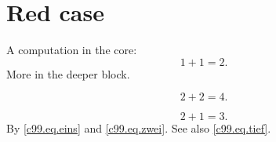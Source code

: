 \chapter{Red case}\label{c99}

A computation in the core:
\begin{equation}\label{c99.eq.eins}
  1 + 1 = 2.
\end{equation}
More in the deeper block.

\begin{vertiefung}[id=c99.v1, titel={Deeper}, wozu={Shows a second computation.},
    voraussetzung={Equation~\eqref{c99.eq.eins}.}, zurueck={It stays at two.}]
  \begin{equation}\label{c99.eq.tief}
    2 + 2 = 4.
  \end{equation}
\end{vertiefung}

\begin{equation}\label{c99.eq.zwei}
  2 + 1 = 3.
\end{equation}
By \eqref{c99.eq.eins} and \eqref{c99.eq.zwei}. See also \eqref{c99.eq.tief}.
